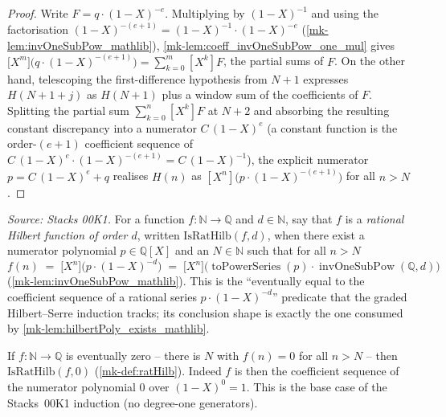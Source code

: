 \begin{proof}
  \leanok
  Write \(F = q\cdot(1-X)^{-e}\). Multiplying by
  \((1-X)^{-1}\) and using the factorisation
  \((1-X)^{-(e+1)} = (1-X)^{-1}\cdot(1-X)^{-e}\)
  (\ref{mk-lem:invOneSubPow_mathlib}), \ref{mk-lem:coeff_invOneSubPow_one_mul} gives
  \(\bigl[X^m\bigr]\bigl(q\cdot(1-X)^{-(e+1)}\bigr) = \sum_{k=0}^{m}[X^k]F\), the
  partial sums of \(F\). On the other hand, telescoping the first-difference
  hypothesis from \(N+1\) expresses \(H(N+1+j)\) as \(H(N+1)\) plus a window sum
  of the coefficients of \(F\). Splitting the partial sum
  \(\sum_{k=0}^{n}[X^k]F\) at \(N+2\) and absorbing the resulting constant
  discrepancy into a numerator \(C\,(1-X)^{e}\) (a constant function is the
  order-\((e+1)\) coefficient sequence of \(C\,(1-X)^{e}\cdot(1-X)^{-(e+1)} =
  C\,(1-X)^{-1}\)), the explicit numerator
  \(p = C\,(1-X)^{e} + q\) realises \(H(n)\) as
  \([X^n]\bigl(p\cdot(1-X)^{-(e+1)}\bigr)\) for all \(n > N\).
\end{proof}

\begin{definition}\label{mk-def:ratHilb}
  \leanok

  \textit{Source: Stacks 00K1.}
  For a function \(f : \mathbb{N} \to \mathbb{Q}\) and \(d \in \mathbb{N}\), say
  that \(f\) is a \emph{rational Hilbert function of order \(d\)}, written
  \(\mathrm{IsRatHilb}(f, d)\), when there exist a numerator polynomial
  \(p \in \mathbb{Q}[X]\) and an \(N \in \mathbb{N}\) such that for all \(n > N\)
  \[
    f(n) \;=\; \bigl[X^n\bigr]\bigl(p\cdot(1-X)^{-d}\bigr)
    \;=\; \bigl[X^n\bigr]\bigl(\operatorname{toPowerSeries}(p)\cdot
      \operatorname{invOneSubPow}(\mathbb{Q}, d)\bigr)
  \]
  (\ref{mk-lem:invOneSubPow_mathlib}). This is the ``eventually equal to the
  coefficient sequence of a rational series \(p\cdot(1-X)^{-d}\)'' predicate that
  the graded Hilbert--Serre induction tracks; its conclusion shape is exactly the
  one consumed by \ref{mk-lem:hilbertPoly_exists_mathlib}.
\end{definition}

\begin{lemma}\label{mk-lem:ratHilb_ofEventuallyZero}
  \leanok

  If \(f : \mathbb{N} \to \mathbb{Q}\) is eventually zero -- there is
  \(N\) with \(f(n) = 0\) for all \(n > N\) -- then \(\mathrm{IsRatHilb}(f, 0)\)
  (\ref{mk-def:ratHilb}). Indeed \(f\) is then the coefficient sequence of the
  numerator polynomial \(0\) over \((1-X)^{0} = 1\). This is the base case of the
  Stacks~00K1 induction (no degree-one generators).
\end{lemma}

